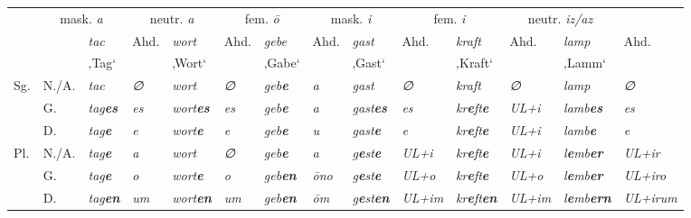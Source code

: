 \begin{sidewaystable}
\small
\begin{tabular}{ *{14}{l} }
\lsptoprule
\multicolumn{2}{c}{germ. DK} & \multicolumn{2}{c}{mask. \textit{a}} & \multicolumn{2}{c}{neutr. \textit{a}} & \multicolumn{2}{c}{fem. \textit{ō}} & \multicolumn{2}{c}{mask. \textit{i}} & \multicolumn{2}{c}{fem. \textit{i}} & \multicolumn{2}{c}{neutr. \textit{iz/az}}\\
\cmidrule(lr){3-4}\cmidrule(lr){5-6}\cmidrule(lr){7-8}\cmidrule(lr){9-10}\cmidrule(lr){11-12}\cmidrule(lr){13-14}
\multicolumn{2}{c}{} & \textit{tac}  & Ahd. & \textit{wort}  & Ahd. & \textit{gebe}  & Ahd. & \textit{gast}  & Ahd. & \textit{kraft}  & Ahd. & \textit{lamp}  & Ahd.\\
\multicolumn{2}{c}{} & ‚Tag‘ & & ‚Wort‘ & & ‚Gabe‘ & & ‚Gast‘ & & ‚Kraft‘ & & ‚Lamm‘ & \\\midrule
Sg. & N./A. & \textit{tac} & \textit{∅} & \textit{wort} & \textit{∅} & \textit{geb\textbf{e}} & \textit{a} & \textit{gast} & \textit{∅} & \textit{kraft} & \textit{∅} & \textit{lamp} & \textit{∅}\\
& G. & \textit{tag\textbf{es}} & \textit{es} & \textit{wort\textbf{es}} & \textit{es} & \textit{geb\textbf{e}} & \textit{a} & \textit{gast\textbf{es}} & \textit{es} & \textit{kr\textbf{e}}\textit{ft\textbf{e}} & \textit{UL+i} & \textit{lamb\textbf{es}} & \textit{es}\\
& D. & \textit{tag\textbf{e}} & \textit{e} & \textit{wort\textbf{e}} & \textit{e} & \textit{geb\textbf{e}} & \textit{u} & \textit{gast\textbf{e}} & \textit{e} & \textit{kr\textbf{e}}\textit{ft\textbf{e}} & \textit{UL+i} & \textit{lamb\textbf{e}} & \textit{e}\\
Pl. & N./A. & \textit{tag\textbf{e}} & \textit{a} & \textit{wort} & \textit{∅} & \textit{geb\textbf{e}} & \textit{a} & \textit{g\textbf{e}}\textit{st\textbf{e}} & {\textit{UL}}\textit{+i} &  \textit{kr\textbf{e}}\textit{ft\textbf{e}} & \textit{UL+i}  & \textit{l\textbf{e}}\textit{mb\textbf{er}} & {\textit{UL}}\textit{+ir}\\
& G. & \textit{tag\textbf{e}} & \textit{o} & \textit{wort\textbf{e}} & \textit{o} & \textit{geb\textbf{en}} & \textit{ōno} & \textit{g\textbf{e}}\textit{st\textbf{e}} & {\textit{UL}}\textit{+o} & \textit{kr\textbf{e}}\textit{ft\textbf{e}} & {\textit{UL}}\textit{+o} & \textit{l\textbf{e}}\textit{mb\textbf{er}} & {\textit{UL}}\textit{+iro}\\
& D. & \textit{tag\textbf{en}} & \textit{um} & \textit{wort\textbf{en}} & \textit{um} & \textit{geb\textbf{en}} & \textit{ōm} & \textit{g\textbf{e}}\textit{st\textbf{en}} & {\textit{UL}}\textit{+im} & \textit{kr\textbf{e}}\textit{ft\textbf{en}} & {\textit{UL}}\textit{+im} & \textit{l\textbf{e}}\textit{mb\textbf{ern}} & {\textit{UL}}\textit{+irum}\\

\end{tabular}
\end{sidewaystable}
